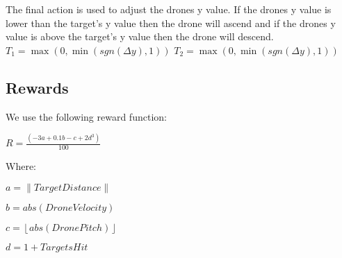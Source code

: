 \endgroup

The final action is used to adjust the drones y value. If the drones y value is lower than the target's y value then the drone will ascend and if the drones y value is above the target's y value then the drone will descend. 
\\
\begingroup\centering
$T_1 =  \max (0,\min (sgn(\Delta y),1))$
$T_2 =  \max (0,\min (sgn(\Delta y),1))$

\endgroup

\subsection{Rewards}
We use the following reward function:

\begingroup\centering

$R=\frac{(-3a+0.1b-c+2d^3)}{100}$

\endgroup

Where:

\begingroup\centering
$a=\left \| Target Distance \right \|$

$b=abs(Drone Velocity)$

$c= \left \lfloor abs(DronePitch)  \right \rfloor $

$d=1+TargetsHit$

\endgroup
